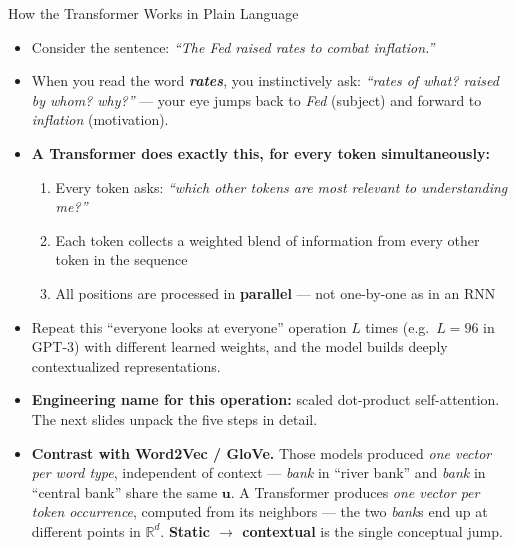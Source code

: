 \documentclass[10pt,english,aspectratio=169]{beamer}
\begin{document}
\begin{frame}{How the Transformer Works in Plain Language}
\begin{itemize}
\item Consider the sentence: \textit{``The Fed raised rates to combat inflation.''}

\medskip
\item When you read the word \textbf{\textit{rates}}, you instinctively ask: \emph{``rates of what? raised by whom? why?''} --- your eye jumps back to \textit{Fed} (subject) and forward to \textit{inflation} (motivation).

\medskip
\item \textbf{A Transformer does exactly this, for every token simultaneously:}
\begin{enumerate}
    \item Every token asks: \emph{``which other tokens are most relevant to understanding me?''}
    \item Each token collects a weighted blend of information from every other token in the sequence
    \item All positions are processed in \textbf{parallel} --- not one-by-one as in an RNN
\end{enumerate}

\medskip
\item Repeat this ``everyone looks at everyone'' operation $L$ times (e.g.\ $L=96$ in GPT-3) with different learned weights, and the model builds deeply contextualized representations.

\medskip
\item \textbf{Engineering name for this operation:} scaled dot-product self-attention. The next slides unpack the five steps in detail.

\medskip
\item \textbf{Contrast with Word2Vec / GloVe.} Those models produced \emph{one vector per word type}, independent of context --- \emph{bank} in ``river bank'' and \emph{bank} in ``central bank'' share the same $\mathbf{u}$. A Transformer produces \emph{one vector per token occurrence}, computed from its neighbors --- the two \emph{bank}s end up at different points in $\mathbb{R}^{d}$. \textbf{Static $\to$ contextual} is the single conceptual jump.
\end{itemize}
\end{frame}
\end{document}
